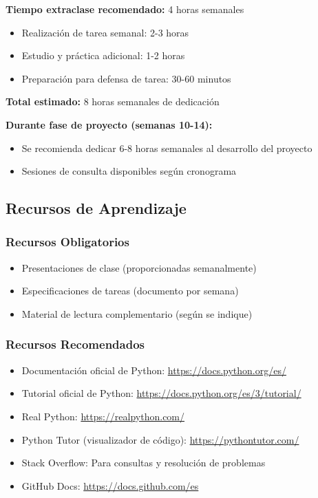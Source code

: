 \documentclass[12pt,letterpaper]{article}
\begin{document}
\textbf{Tiempo extraclase recomendado:} 4 horas semanales
\begin{itemize}[leftmargin=*]
    \item Realización de tarea semanal: 2-3 horas
    \item Estudio y práctica adicional: 1-2 horas
    \item Preparación para defensa de tarea: 30-60 minutos
\end{itemize}

\textbf{Total estimado:} 8 horas semanales de dedicación

\textbf{Durante fase de proyecto (semanas 10-14):}
\begin{itemize}[leftmargin=*]
    \item Se recomienda dedicar 6-8 horas semanales al desarrollo del proyecto
    \item Sesiones de consulta disponibles según cronograma
\end{itemize}

\subsection{Recursos de Aprendizaje}

\subsubsection{Recursos Obligatorios}
\begin{itemize}[leftmargin=*]
    \item Presentaciones de clase (proporcionadas semanalmente)
    \item Especificaciones de tareas (documento por semana)
    \item Material de lectura complementario (según se indique)
\end{itemize}

\subsubsection{Recursos Recomendados}
\begin{itemize}[leftmargin=*]
    \item Documentación oficial de Python: \url{https://docs.python.org/es/}
    \item Tutorial oficial de Python: \url{https://docs.python.org/es/3/tutorial/}
    \item Real Python: \url{https://realpython.com/}
    \item Python Tutor (visualizador de código): \url{https://pythontutor.com/}
    \item Stack Overflow: Para consultas y resolución de problemas
    \item GitHub Docs: \url{https://docs.github.com/es}
\end{itemize}
\end{document}

